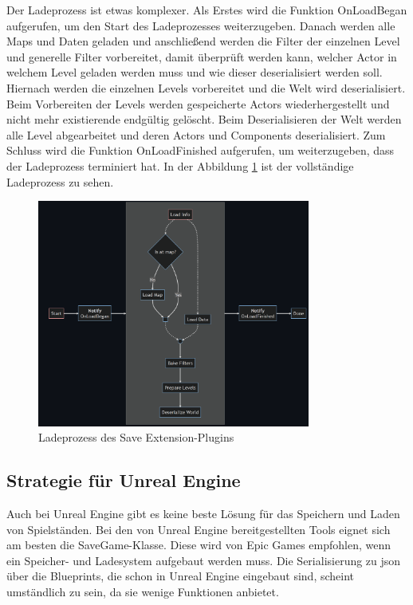 Der Ladeprozess ist etwas komplexer. Als Erstes wird die Funktion OnLoadBegan aufgerufen, um den Start des Ladeprozesses weiterzugeben. Danach werden alle Maps und Daten geladen und anschließend werden die Filter der einzelnen Level und generelle Filter vorbereitet, damit überprüft werden kann, welcher Actor in welchem Level geladen werden muss und wie dieser deserialisiert werden soll. Hiernach werden die einzelnen Levels vorbereitet und die Welt wird deserialisiert. Beim Vorbereiten der Levels werden gespeicherte Actors wiederhergestellt und nicht mehr existierende endgültig gelöscht. Beim Deserialisieren der Welt werden alle Level abgearbeitet und deren Actors und Components deserialisiert. Zum Schluss wird die Funktion OnLoadFinished aufgerufen, um weiterzugeben, dass der Ladeprozess terminiert hat. In der Abbildung \ref{fig:piperiftLoadProcess} ist der vollständige Ladeprozess zu sehen.\cite{piperiftLoadProcess}

\begin{figure}[htp]
    \centering
    \includegraphics[width=0.8\textwidth]{images/piperift_load_process.png}
    \caption{Ladeprozess des Save Extension-Plugins \cite{piperiftLoadProcess}}
    \label{fig:piperiftLoadProcess}
\end{figure}



\subsection{Strategie für Unreal Engine}
Auch bei Unreal Engine gibt es keine beste Lösung für das Speichern und Laden von Spielständen. Bei den von Unreal Engine bereitgestellten Tools eignet sich am besten die SaveGame-Klasse. Diese wird von Epic Games empfohlen, wenn ein Speicher- und Ladesystem aufgebaut werden muss. Die Serialisierung zu \ac{json} über die Blueprints, die schon in Unreal Engine eingebaut sind, scheint umständlich zu sein, da sie wenige Funktionen anbietet. 

